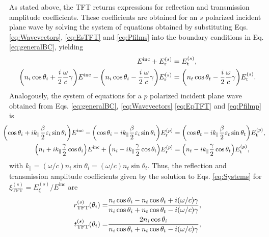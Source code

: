 As stated above, the TFT returns expressions for reflection and transmission amplitude coefficients. These coefficients are obtained for an $s$ polarized incident plane wave by solving the  system of equations obtained by substituting Eqs. \eqref{eq:Wavevectors}, \eqref{eq:EsTFT} and \eqref{eq:Pfilms} into the boundary conditions in Eq. \eqref{eq:generalBC}, yielding
%
\begin{subequations}%
\begin{align}
	E^\text{inc} + E^{(s)}_\text{r}  & =  E^{(s)}_\text{t}   ,\\
	\qty(n_i\cos\theta_i+ \frac{i}{2}\frac{\omega}{c}\gamma)E^\text{inc}
	- \qty(n_i\cos\theta_i- \frac{i}{2}\frac{\omega}{c}\gamma)E^{(s)}_\text{r}
	&= \qty(n_t\cos\theta_t- \frac{i}{2}\frac{\omega}{c}\gamma)E^{(s)}_\text{t}.
\end{align}%
\label{eq:Systems}%
\end{subequations}%
%
Analogously, the system of equations for a $p$ polarized incident plane wave obtained from Eqs. \eqref{eq:generalBC}, \eqref{eq:Wavevectors} \eqref{eq:EpTFT} and \eqref{eq:Pfilmp} is
%
\begin{subequations}%
\begin{align}
			\hspace*{-1em}\qty(\cos\theta_i + ik_\parallel\frac{\beta}{2}\varepsilon_i\sin\theta_i)E^\text{inc} 
			- \qty(\cos\theta_i - ik_\parallel\frac{\beta}{2}\varepsilon_i\sin\theta_i)E^{(p)}_\text{r}
			&= \qty(\cos\theta_t -ik_\parallel\frac{\beta}{2}\varepsilon_t\sin\theta_t) E^{(p)}_\text{t} ,\\
%	
			\qty(n_i + ik_\parallel\frac{\gamma}{2}\cos\theta_i)E^\text{inc} 
			+ \qty(n_i - ik_\parallel\frac{\gamma}{2}\cos\theta_i)E^{(p)}_\text{r}  
			&= \qty(n_t - ik_\parallel\frac{\gamma}{2}\cos\theta_t) E^{(p)}_\text{t} ,
\end{align}%
\label{eq:Systemp}%
\end{subequations}
%
with $k_\parallel = (\omega/c)n_i\sin\theta_i =(\omega/c)n_t\sin\theta_t$. Thus, the reflection and transmission amplitude coefficients given by the solution to Eqs. \eqref{eq:Systems} for $\xi ^{(s)}_\text{TFT} = E_\xi^{(s)}/E^\text{inc}$ are \cite{lazzari_granfilm_2002,bedeaux_optical_2004,cuanalo_phase_2024}
%
\begin{subequations}%
{\allowdisplaybreaks\begin{align}
	r^{(s)}_\text{TFT}(\theta_i) =& 
				\frac{ n_i \cos\theta_i - n_t\cos\theta_t + i (\omega/c)\gamma }
			   		 { n_i \cos\theta_i + n_t\cos\theta_t - i (\omega/c)\gamma },
	\label{eq:rsTFT} \\
	t^{(s)}_\text{TFT}(\theta_i) =& 
				\frac{ 2 n_i \cos\theta_i}
					 { n_i \cos\theta_i + n_t\cos\theta_t - i (\omega/c)\gamma },
\end{align}}%
\label{eq:rtsTFT}%
\end{subequations}
